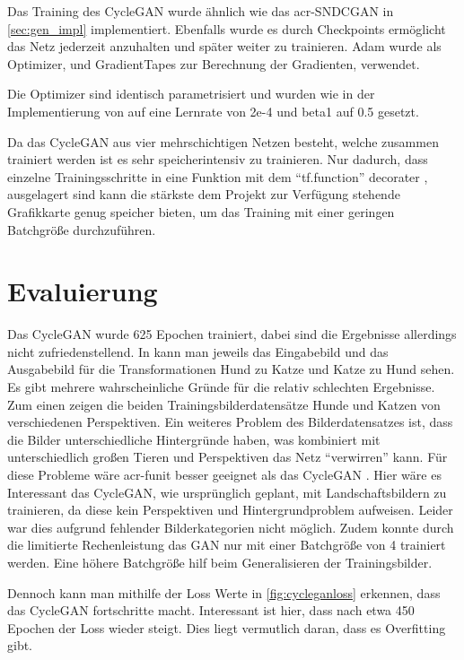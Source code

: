  Das Training des CycleGAN wurde ähnlich wie das \gls{acr-SNDCGAN} in \cref{sec:gen_impl} implementiert. Ebenfalls wurde es durch Checkpoints ermöglicht das Netz jederzeit anzuhalten und später weiter zu trainieren. Adam \cite{tf:adam} wurde als Optimizer, und GradientTapes \cite{tf:gradientape} zur Berechnung der Gradienten, verwendet.
 
Die Optimizer sind identisch parametrisiert und wurden wie in der Implementierung von \cite{brownlee_how_2019-1} auf eine Lernrate von 2e-4 und beta1 auf 0.5 gesetzt. 

Da das CycleGAN aus vier mehrschichtigen Netzen besteht, welche zusammen trainiert werden ist es sehr speicherintensiv zu trainieren. Nur dadurch, dass einzelne Trainingsschritte in eine Funktion mit dem \enquote{tf.function} decorater \cite{noauthor_tffunction_nodate}, ausgelagert sind kann die stärkste dem Projekt zur Verfügung stehende Grafikkarte genug speicher bieten, um das Training mit einer geringen Batchgröße durchzuführen. 


 \section{Evaluierung} %
 
 Das CycleGAN wurde 625 Epochen trainiert, dabei sind die Ergebnisse allerdings nicht 
 zufriedenstellend. In  kann man jeweils das 
 Eingabebild und das Ausgabebild für die Transformationen Hund zu Katze und Katze zu Hund 
 sehen. Es gibt mehrere wahrscheinliche Gründe für die relativ schlechten Ergebnisse. Zum einen 
 zeigen die beiden Trainingsbilderdatensätze Hunde und Katzen von verschiedenen Perspektiven. 
 Ein weiteres Problem des Bilderdatensatzes ist, dass die Bilder unterschiedliche Hintergründe 
 haben, was kombiniert mit unterschiedlich großen Tieren und Perspektiven das Netz 
 \enquote{verwirren} kann. Für diese Probleme wäre \gls{acr-funit} besser geeignet als das 
 CycleGAN 
 \cite{liu2019few}. Hier wäre es Interessant das CycleGAN, wie ursprünglich geplant, mit
 Landschaftsbildern zu trainieren, da diese kein Perspektiven und Hintergrundproblem aufweisen. 
 Leider war dies aufgrund fehlender Bilderkategorien nicht möglich. Zudem konnte durch die 
 limitierte Rechenleistung das GAN nur mit einer Batchgröße von 4 trainiert werden. Eine höhere 
 Batchgröße hilf beim Generalisieren der Trainingsbilder. 
 
 Dennoch kann man mithilfe der Loss Werte in \cref{fig:cycleganloss} erkennen, dass das CycleGAN 
 fortschritte macht. Interessant ist hier, dass nach etwa 450 Epochen der Loss wieder steigt. Dies 
 liegt vermutlich daran, dass es Overfitting gibt. 


